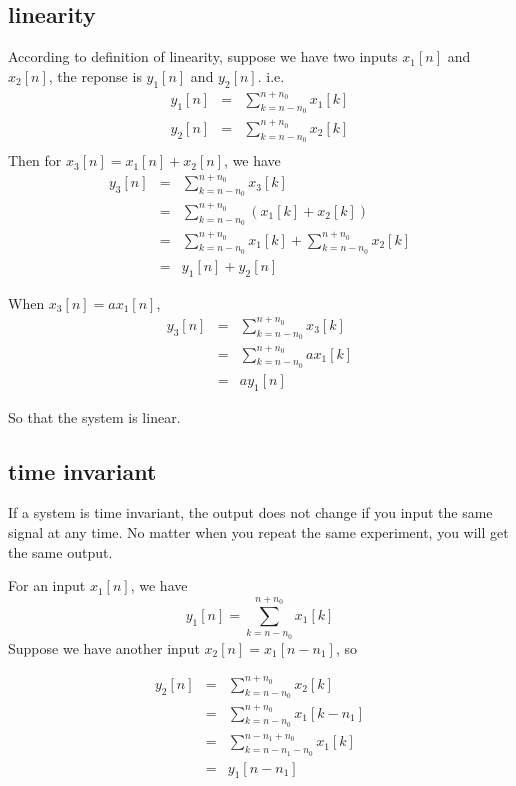 \documentclass[koma,a4paper,utopia,12pt,listings-color,microtype,paralist,colorlinks,urlcolor=red]{org-article}
\begin{document}
\subsection{linearity}
\label{sec:orgb420d77}
According to definition of linearity, suppose we have two inputs \(x_{1}[n]\)
and \(x_{2}[n]\), the reponse is \(y_{1}[n]\) and \(y_{2}[n]\). i.e.
\begin{eqnarray*}
y_{1}[n]&=& \sum_{k=n-n_{0}}^{n+n_{0}} x_{1}[k] \\
y_{2}[n]&=& \sum_{k=n-n_{0}}^{n+n_{0}} x_{2}[k] \\
\end{eqnarray*}
Then for \(x_{3}[n] = x_{1}[n] + x_{2}[n]\), we have
\begin{eqnarray*}
y_{3}[n]&=& \sum_{k=n-n_{0}}^{n+n_{0}} x_{3}[k]   \\
&=& \sum_{k=n-n_{0}}^{n+n_{0}} (x_{1}[k] + x_{2}[k]) \\
&=&\sum_{k=n-n_{0}}^{n+n_{0}} x_{1}[k]   + \sum_{k=n-n_{0}}^{n+n_{0}} x_{2}[k]   \\
&=& y_{1}[n] + y_{2}[n]
\end{eqnarray*}

When \(x_{3}[n] = ax_{1}[n]\),
\begin{eqnarray*}
y_{3}[n] &=& \sum_{k=n-n_{0}}^{n+n_{0}} x_{3}[k]   \\
&=& \sum_{k=n-n_{0}}^{n+n_{0}} ax_{1}[k] \\
&=& a y_{1}[n]
\end{eqnarray*}

So that the system is linear.
\subsection{time invariant}
\label{sec:orgee6e1e5}

If a system is time invariant, the output does not change if you input the
same signal at any time. No matter when you repeat the same experiment, you will
get the same output.

For an input \(x_{1}[n]\), we have
\begin{equation*}
y_{1}[n] = \sum_{k=n-n_{0}}^{n+n_{0}} x_{1}[k]
\end{equation*}
Suppose we have another input \(x_{2}[n] = x_{1}[n-n_{1}]\), so

\begin{eqnarray*}
y_{2}[n]&=& \sum_{k=n-n_{0}}^{n+n_{0}} x_{2}[k]  \\
&=& \sum_{k=n-n_{0}}^{n+n_{0}} x_{1}[k-n_{1}] \\
&=& \sum_{k=n-n_{1}-n_{0}}^{n-n_{1}+n_{0}} x_{1}[k] \\
&=& y_{1}[n-n_{1}]
\end{eqnarray*}
\end{document}
